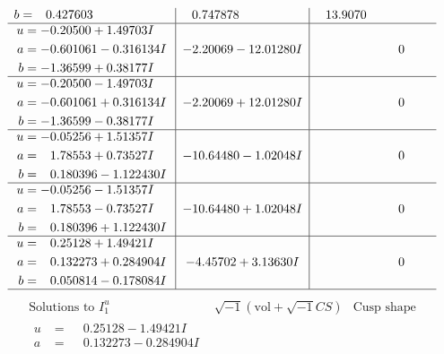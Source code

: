 \documentclass[1p]{elsarticle_modified}
\theoremstyle{definition}
\newcommand{\I}{\sqrt{-1}}
\begin{document}
$$\begin{array}{c|c|c}
\begin{aligned}
b &= \phantom{-}0.427603\phantom{ +0.000000I}\end{aligned}
 & \phantom{-}0.747878\phantom{ +0.000000I} & \phantom{-}13.9070\phantom{ +0.000000I} \\ \hline\begin{aligned}
u &= -0.20500 + 1.49703 I \\
a &= -0.601061 - 0.316134 I \\
b &= -1.36599 + 0.38177 I\end{aligned}
 & -2.20069 - 12.01280 I & \phantom{-0.000000 } 0 \\ \hline\begin{aligned}
u &= -0.20500 - 1.49703 I \\
a &= -0.601061 + 0.316134 I \\
b &= -1.36599 - 0.38177 I\end{aligned}
 & -2.20069 + 12.01280 I & \phantom{-0.000000 } 0 \\ \hline\begin{aligned}
u &= -0.05256 + 1.51357 I \\
a &= \phantom{-}1.78553 + 0.73527 I \\
b &= \phantom{-}0.180396 - 1.122430 I\end{aligned}
 & -10.64480 - 1.02048 I & \phantom{-0.000000 } 0 \\ \hline\begin{aligned}
u &= -0.05256 - 1.51357 I \\
a &= \phantom{-}1.78553 - 0.73527 I \\
b &= \phantom{-}0.180396 + 1.122430 I\end{aligned}
 & -10.64480 + 1.02048 I & \phantom{-0.000000 } 0 \\ \hline\begin{aligned}
u &= \phantom{-}0.25128 + 1.49421 I \\
a &= \phantom{-}0.132273 + 0.284904 I \\
b &= \phantom{-}0.050814 - 0.178084 I\end{aligned}
 & -4.45702 + 3.13630 I & \phantom{-0.000000 } 0\\
 \hline 
 \end{array}$$\newpage$$\begin{array}{c|c|c}  
\text{Solutions to }I^u_{1}& \I (\text{vol} + \sqrt{-1}CS) & \text{Cusp shape}\\
 \hline 
\begin{aligned}
u &= \phantom{-}0.25128 - 1.49421 I \\
a &= \phantom{-}0.132273 - 0.284904 I \\

\end{aligned}
\end{array}$$
\end{document}
